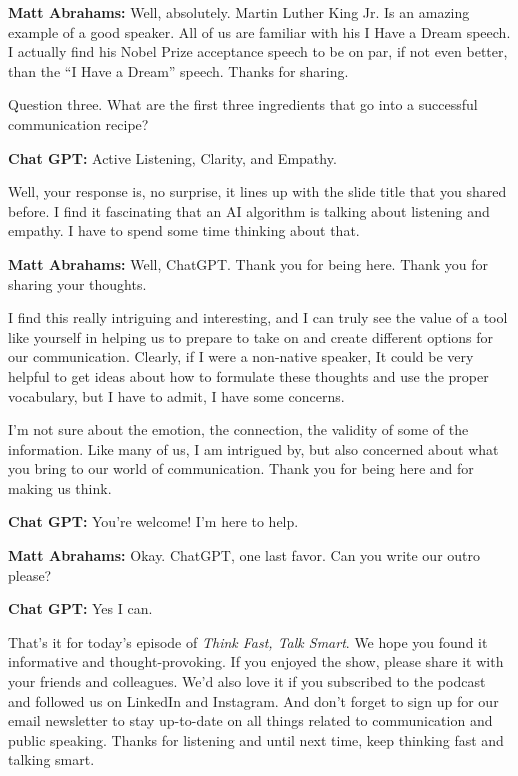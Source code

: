 \documentclass{article}
\begin{document}
\textbf{Matt Abrahams: }Well, absolutely. Martin Luther King Jr. Is an amazing example of a good speaker. All of us are familiar with his I Have a Dream speech. I actually find his Nobel Prize acceptance speech to be on par, if not even better, than the “I Have a Dream” speech. Thanks for sharing.

Question three. What are the first three ingredients that go into a successful communication recipe?

\textbf{Chat GPT: }Active Listening, Clarity, and Empathy.

Well, your response is, no surprise, it lines up with the slide title that you shared before. I find it fascinating that an AI algorithm is talking about listening and empathy. I have to spend some time thinking about that.

\textbf{Matt Abrahams: }Well, ChatGPT. Thank you for being here. Thank you for sharing your thoughts.

I find this really intriguing and interesting, and I can truly see the value of a tool like yourself in helping us to prepare to take on and create different options for our communication. Clearly, if I were a non-native speaker, It could be very helpful to get ideas about how to formulate these thoughts and use the proper vocabulary, but I have to admit, I have some concerns.

I’m not sure about the emotion, the connection, the validity of some of the information. Like many of us, I am intrigued by, but also concerned about what you bring to our world of communication. Thank you for being here and for making us think.

\textbf{Chat GPT: }You’re welcome! I’m here to help.

\textbf{Matt Abrahams: }Okay. ChatGPT, one last favor. Can you write our outro please?

\textbf{Chat GPT: }Yes I can.

That’s it for today’s episode of \textsl{Think Fast, Talk Smart}. We hope you found it informative and thought-provoking. If you enjoyed the show, please share it with your friends and colleagues. We’d also love it if you subscribed to the podcast and followed us on LinkedIn and Instagram. And don’t forget to sign up for our email newsletter to stay up-to-date on all things related to communication and public speaking. Thanks for listening and until next time, keep thinking fast and talking smart.
\end{document}
